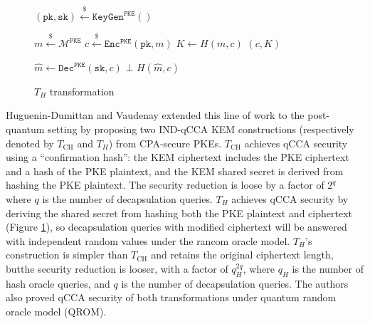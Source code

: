 \documentclass[letterpaper,12pt,titlepage,oneside,final]{book}
\newcommand{\pke}{\texttt{PKE}}
\newcommand{\keygen}{\texttt{KeyGen}}
\newcommand{\encrypt}{\texttt{Enc}}
\newcommand{\decrypt}{\texttt{Dec}}
\newcommand{\encap}{\texttt{Encap}}
\newcommand{\decap}{\texttt{Decap}}
\newcommand{\pk}{\texttt{pk}}
\newcommand{\sk}{\texttt{sk}}
\newcommand{\leftsample}{\stackrel{\$}{\leftarrow}}
\begin{document}
\begin{figure}[htbp]
    \centering
    \begin{minipage}[t]{0.33\textwidth}
        \begin{algorithm}[H]
            \caption*{\keygen}
            \begin{algorithmic}[1]
                \State $(\pk, \sk) \leftsample \keygen^\pke()$
            \end{algorithmic}
        \end{algorithm}
    \end{minipage}\hfill
    \begin{minipage}[t]{0.3\textwidth}
        \begin{algorithm}[H]
            \caption*{$\encap(\pk)$}
            \begin{algorithmic}[1]
                \State $m \leftsample \mathcal{M}^\pke$
                \State $c \leftsample \encrypt^\pke(\pk, m)$
                \State $K \leftarrow H(m, c)$
                \State \Return $(c, K)$
            \end{algorithmic}
        \end{algorithm}
    \end{minipage}\hfill
    \begin{minipage}[t]{0.33\textwidth}
        \begin{algorithm}[H]
            \caption*{$\decap(\sk, c)$}
            \begin{algorithmic}[1]
                \State $\hat{m} \leftarrow \decrypt^\pke(\sk, c)$
                    \State\Return $\bot$
                \EndIf
                \State \Return $H(\hat{m}, c)$
            \end{algorithmic}
        \end{algorithm}
    \end{minipage}
    \caption{$T_H$ transformation}
    \label{fig:dumittan-th-transform}
\end{figure}

Huguenin-Dumittan and Vaudenay \cite{DBLP:conf/eurocrypt/Huguenin-Dumittan22} extended this line of work to the post-quantum setting by proposing two IND-qCCA KEM constructions (respectively denoted by $T_\text{CH}$ and $T_H$) from CPA-secure PKEs. 
$T_\text{CH}$ achieves qCCA security using a ``confirmation hash'': the KEM ciphertext includes the PKE ciphertext and a hash of the PKE plaintext, and the KEM shared secret is derived from hashing the PKE plaintext.
The security reduction is loose by a factor of $2^q$ where $q$ is the number of decapsulation queries.
$T_H$ achieves qCCA security by deriving the shared secret from hashing both the PKE plaintext and ciphertext (Figure \ref{fig:dumittan-th-transform}), so decapsulation queries with modified ciphertext will be answered with independent random values under the rancom oracle model.
$T_H$'s construction is simpler than $T_\text{CH}$ and retains the original ciphertext length, butthe security reduction is looser, with a factor of $q_H^{2q}$, where $q_H$ is the number of hash oracle queries, and $q$ is the number of decapsulation queries.
The authors also proved qCCA security of both transformations under quantum random oracle model (QROM).
\end{document}
